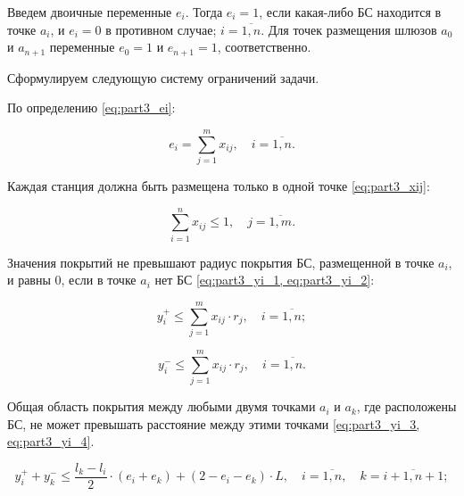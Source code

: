 Введем двоичные переменные $ e_i $. Тогда $ e_i = 1 $, если какая-либо БС находится в точке $ a_i $, и $ e_i = 0$  в противном случае; $ i = \overline {1, n} $. Для точек размещения шлюзов $ a_0 $ и $a_{n + 1}$ переменные $ e_0 = 1 $ и $ e_{n + 1} =1 $, соответственно. 


Сформулируем следующую систему ограничений задачи.

По определению \cref{eq:part3_ei}:

\begin{equation}
  \label{eq:part3_ei}
  e_i =  \sum\limits_{j=1}^m x_{ij}, \quad i = \overline{1,n}. 
\end{equation}

Каждая станция должна быть размещена только в одной точке \cref{eq:part3_xij}:

\begin{equation}
  \label{eq:part3_xij}
  \sum\limits_{i=1}^n x_{ij} \leq 1, \quad j = \overline{1,m}. 
\end{equation}

Значения покрытий не превышают радиус покрытия БС, размещенной в точке $ a_i $, и равны 0, если в точке $a_i$  нет БС \cref{eq:part3_yi_1, eq:part3_yi_2}:


\begin{equation}
  \label{eq:part3_yi_1}
  y_i^+ \leq \sum\limits_{j=1}^m x_{ij} \cdot r_j, \quad i = \overline{1,n};
\end{equation}

\begin{equation}
  \label{eq:part3_yi_2}
  y_i^- \leq \sum\limits_{j=1}^m x_{ij} \cdot r_j, \quad i = \overline{1,n}. 
\end{equation}

Общая область покрытия между любыми двумя точками $ a_i $ и $ a_k $, где расположены БС, не может превышать расстояние между этими точками \cref{eq:part3_yi_3, eq:part3_yi_4}.

\begin{equation}
  \label{eq:part3_yi_3}
  y_i^+ + y_k^- \leq \frac{l_k - l_i}{2} \cdot (e_i + e_k ) + (2 - e_i - e_k ) \cdot L, \quad i = \overline{1,n},  \quad k = \overline{i+1,n+1};
\end{equation}

